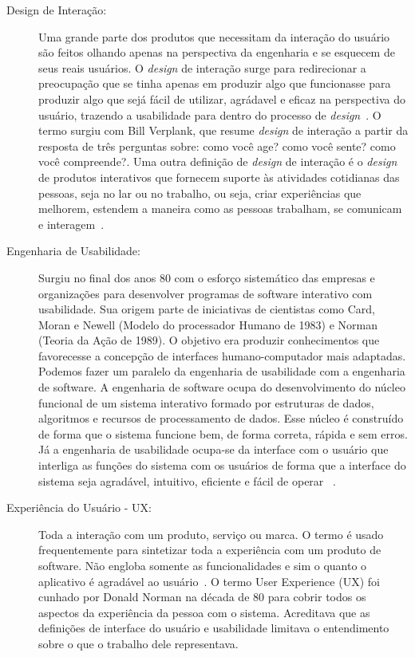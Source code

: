 \begin{description}
\item[Design de Interação:]

Uma grande parte dos produtos que necessitam da interação do usuário são feitos olhando apenas na perspectiva da engenharia e se esquecem de seus reais usuários. O \emph{design} de interação surge para redirecionar a preocupação que se tinha apenas em produzir algo que funcionasse para produzir algo que sejá fácil de utilizar, agrádavel e eficaz na perspectiva do usuário, trazendo a usabilidade para dentro do processo de \emph{design}~\cite{preece2007}.
%
O termo surgiu com Bill Verplank, que resume \emph{design} de interação a partir da resposta de três perguntas sobre: como você age? como você sente? como você compreende?\cite{moggridge2006}. 
%
Uma outra definição de \emph{design} de interação é o \emph{design} de produtos interativos que fornecem suporte às atividades cotidianas das pessoas, seja no lar ou no trabalho, ou seja, criar experiências que melhorem, estendem a maneira como as pessoas trabalham, se comunicam e interagem~\cite{preece2007}.


\item[Engenharia de Usabilidade:]

Surgiu no final dos anos 80 com o esforço sistemático das empresas e organizações para desenvolver programas de software interativo com usabilidade. Sua origem parte de iniciativas de cientistas como Card, Moran e Newell (Modelo do processador Humano de 1983) e Norman (Teoria da Ação de 1989). O objetivo era produzir conhecimentos que favorecesse a concepção de interfaces humano-computador mais adaptadas.
%
Podemos fazer um paralelo da engenharia de usabilidade com a engenharia de software. A engenharia de software ocupa do desenvolvimento do núcleo funcional de um sistema interativo formado por estruturas de dados, algoritmos e recursos de processamento de dados. Esse núcleo é construído de forma que o sistema funcione bem, de forma correta, rápida e sem erros. Já a engenharia de usabilidade ocupa-se da interface com o usuário que interliga as funções do sistema com os usuários de forma que a interface do sistema seja agradável, intuitivo, eficiente e fácil de operar ~\cite{cybis2010}.
%
%

\item[Experiência do Usuário - UX: ]

Toda a interação com um produto, serviço ou marca. O termo é usado frequentemente para sintetizar toda a experiência com um produto de software. Não engloba  somente as funcionalidades e sim o quanto o aplicativo é  agradável ao usuário~\cite{travis2013}.
%	
O termo User Experience (UX) foi cunhado por Donald Norman na década de 80 para cobrir todos os aspectos da experiência da pessoa com o sistema. Acreditava que as definições de interface do usuário e usabilidade limitava o entendimento sobre o que o trabalho dele representava. 
%

\end{description}

